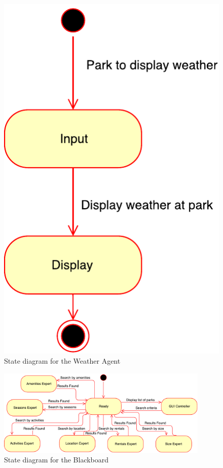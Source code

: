 \documentclass[titlepage,12pt]{article}
\begin{document}
\begin{figure}[H]
\begin{minipage}[b]{0.455\textwidth}
        \includegraphics[width=\textwidth]{state_diagrams/WeatherAgent}
        \caption{State diagram for the Weather Agent}
        \label{fig:weather_agent}
    \end{minipage}
\end{figure}

\begin{figure}[H]
    \centerline{\includegraphics[width=0.90\textwidth]{state_diagrams/BlackBoard}}
    \caption{State diagram for the Blackboard}
    \label{fig:blackboard}
\end{figure}
\end{document}
